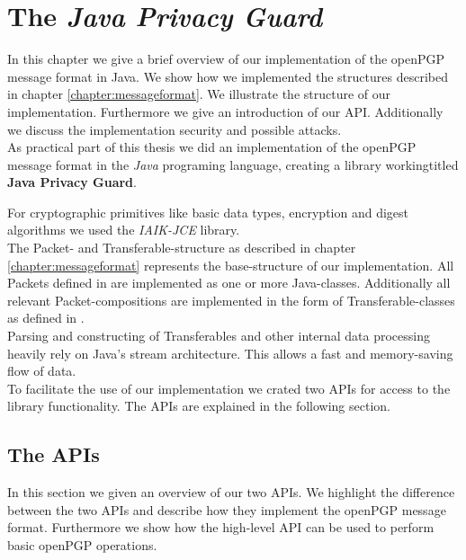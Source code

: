 \chapter{The \textit{Java Privacy Guard}} \label{chapter:jpg}

In this chapter we give a brief overview of our implementation of the openPGP message format in Java. We show how we implemented the structures described in chapter \ref{chapter:messageformat}. We illustrate the structure of our implementation. Furthermore we give an introduction of our API.
Additionally we discuss the implementation security and possible attacks.  \\


As practical part of this thesis we did an implementation of the openPGP message format  in the \textit{Java} programing language, creating a library workingtitled \textbf{Java Privacy Guard}.

For cryptographic primitives like basic data types, encryption and digest algorithms we used the \textit{IAIK-JCE} library. \\

The Packet- and Transferable-structure as described in chapter \ref{chapter:messageformat} represents the base-structure of our implementation. All Packets defined in  are implemented as one or more Java-classes. Additionally all relevant Packet-compositions are implemented in the form of Transferable-classes as defined in . \\

Parsing and constructing of Transferables and other internal data processing heavily rely on Java's stream architecture. This allows a fast and memory-saving flow of data. \\

To facilitate the use of our implementation we crated two APIs for access to the library functionality. The APIs are explained in the following section.

\section{The APIs}

In this section we given an overview of our two APIs. We highlight the difference between the two APIs and describe how they implement the openPGP message format. Furthermore we show how the high-level API can be used to perform basic openPGP operations. \\

